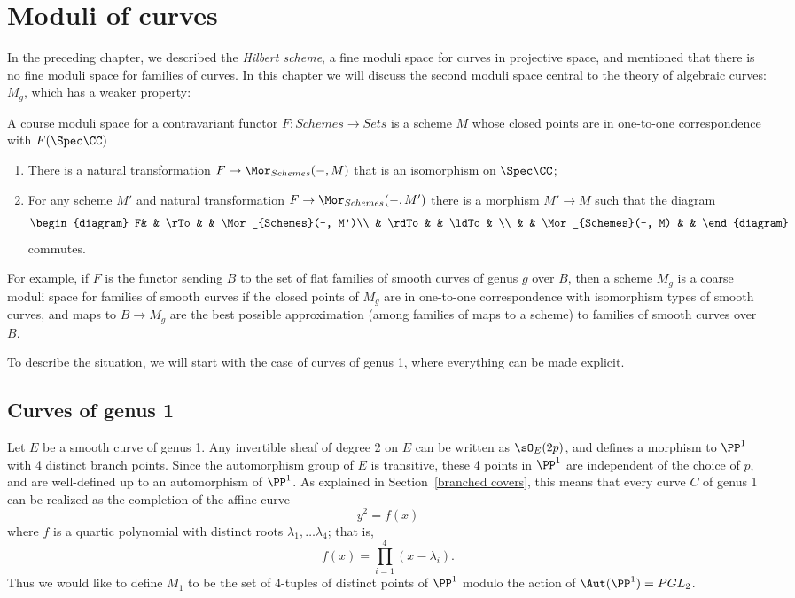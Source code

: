 


\chapter{Moduli of curves} 
\label{CurvesModuli chapter}\label{CurvesModuliChapter}


In the preceding chapter, we described the \emph{Hilbert scheme}, a fine moduli space for curves in projective space, and mentioned that there is no fine moduli space for families of curves. In
this chapter we will discuss the second moduli space central to the theory of algebraic curves: $M_g$, which has a weaker property:
\begin{definition}\label{coarse moduli definition}
A course moduli space for a contravariant functor $F: Schemes \to Sets$ 
is a scheme $M$ whose closed points
are in one-to-one correspondence with $F(\Spec \CC)$ 
\begin{enumerate}
\item There is a natural transformation $F \to \Mor_{Schemes}(-, M)$ that is an isomorphism on $\Spec \CC$;
\item For any scheme $M'$ and natural transformation $F \to \Mor_{Schemes}(-, M')$
 there is a morphism $M' \to M$ such that the diagram
$$
\begin{diagram}
F& & \rTo & & \Mor_{Schemes}(-, M')\\
& \rdTo & & \ldTo & \\
& & \Mor_{Schemes}(-, M) & &
\end{diagram} 
$$
commutes.
\end{enumerate}
For example, if $F$ is the functor sending $B$ to the set of flat families of smooth curves of genus $g$ over $B$,
then a scheme $M_g$ is a coarse moduli space for families of smooth curves if the closed points of $M_g$ are in one-to-one correspondence with isomorphism types of smooth curves,
and maps to $B \to M_g$ are the best possible approximation (among families of maps to a scheme) to families
of smooth curves over $B$.
\end{definition}

To describe the situation,  we will start with the case of curves of genus 1, where everything can be made explicit.


\section{Curves of genus 1}

Let $E$ be a smooth curve of genus 1. Any invertible sheaf of degree 2 on $E$ can be written as
$\sO_E(2p)$, and defines
a morphism to $\PP^1$ with 4 distinct branch points. Since the automorphism group of $E$ is transitive,
these 4 points in $\PP^1$ are independent of the choice of $p$, and are well-defined
up to an automorphism of $\PP^1$.    As explained in Section~\ref{branched covers},  this means that every curve $C$ of genus 1 can be realized as the completion of the affine curve
$$
y^2 = f(x)
$$
where $f$ is a quartic polynomial with distinct roots $\lambda_1, \dots \lambda_4$; that is, 
$$
f(x) = \prod_{i=1}^4 (x - \lambda_i).
$$
Thus we would like to define $M_1$ to be the set of 4-tuples of distinct points of $\PP^1$ modulo the action of $\Aut(\PP^1) = PGL_2$.

